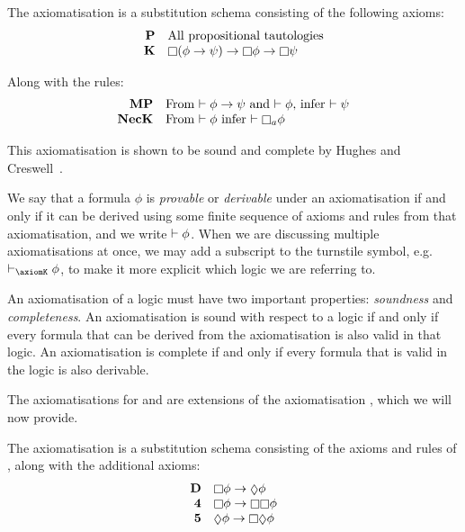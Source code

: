 \begin{definition}\label{pre-axiom-k}
The axiomatisation \axiomK{} is a substitution schema consisting of the
following axioms:
$$
\begin{array}{rl}
{\bf P} & \text{All propositional tautologies}\\
{\bf K} & \knows (\phi \implies \psi) \implies \knows \phi \implies \knows
\psi\\
\end{array}
$$

Along with the rules:
$$
\begin{array}{rl}
{\bf MP} & \text{From $\proves \phi \implies \psi$ and $\proves \phi$, infer
$\proves \psi$}\\
{\bf NecK} & \text{From $\proves \phi$ infer $\proves \knows_a \phi$}\\
\end{array}
$$
\end{definition}

This axiomatisation is shown to be sound and complete by Hughes and
Creswell~\cite{hughes1996new}.

We say that a formula $\phi$ is {\em provable} or {\em derivable} under an
axiomatisation if and only if it can be derived using some finite sequence of
axioms and rules from that axiomatisation, and we write $\vdash \phi$. When we
are discussing multiple axiomatisations at once, we may add a subscript to the
turnstile symbol, e.g. $\proves_\axiomK \phi$, to make it more explicit which
logic we are referring to.

An axiomatisation of a logic must have two important properties: {\em soundness}
and {\em completeness}. An axiomatisation is sound with respect to a logic if
and only if every formula that can be derived from the axiomatisation is also
valid in that logic. An axiomatisation is complete if and only if every formula
that is valid in the logic is also derivable.

The axiomatisations for \logicKD{} and \logicS{} are extensions of the
axiomatisation \axiomK{}, which we will now provide.

\begin{definition}
The axiomatisation \axiomKD{} is a substitution schema consisting of the axioms
and rules of \axiomK{}, along with the additional axioms:
$$
\begin{array}{rl}
{\bf D} & \knows \phi \implies \suspects \phi\\
{\bf 4} & \knows \phi \implies \knows \knows \phi\\
{\bf 5} & \suspects \phi \implies \knows \suspects \phi\\
\end{array}
$$
\end{definition}

